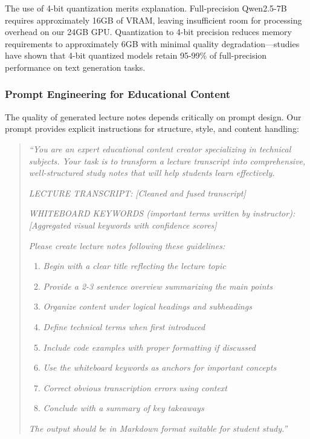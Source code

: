 The use of 4-bit quantization merits explanation. Full-precision Qwen2.5-7B requires approximately 16GB of VRAM, leaving insufficient room for processing overhead on our 24GB GPU. Quantization to 4-bit precision reduces memory requirements to approximately 6GB with minimal quality degradation---studies have shown that 4-bit quantized models retain 95-99\% of full-precision performance on text generation tasks.

\subsubsection{Prompt Engineering for Educational Content}

The quality of generated lecture notes depends critically on prompt design. Our prompt provides explicit instructions for structure, style, and content handling:

\begin{quote}
\textit{``You are an expert educational content creator specializing in technical subjects. Your task is to transform a lecture transcript into comprehensive, well-structured study notes that will help students learn effectively.}

\textit{LECTURE TRANSCRIPT:}
\textit{[Cleaned and fused transcript]}

\textit{WHITEBOARD KEYWORDS (important terms written by instructor):}
\textit{[Aggregated visual keywords with confidence scores]}

\textit{Please create lecture notes following these guidelines:}
\begin{enumerate}
    \item \textit{Begin with a clear title reflecting the lecture topic}
    \item \textit{Provide a 2-3 sentence overview summarizing the main points}
    \item \textit{Organize content under logical headings and subheadings}
    \item \textit{Define technical terms when first introduced}
    \item \textit{Include code examples with proper formatting if discussed}
    \item \textit{Use the whiteboard keywords as anchors for important concepts}
    \item \textit{Correct obvious transcription errors using context}
    \item \textit{Conclude with a summary of key takeaways}
\end{enumerate}
\textit{The output should be in Markdown format suitable for student study.''}
\end{quote}

